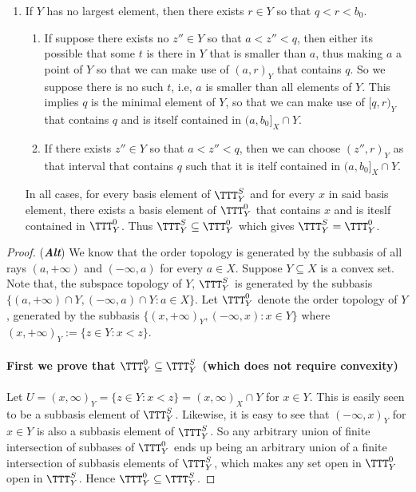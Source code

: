 \documentclass[main.tex]{subfiles}
\begin{document}
{\begin{enumerate}
    \item If $Y$ has no largest element, then there exists $r\in Y$ so that $q<r<b_0$. \begin{enumerate}
        \item If suppose there exists no $z'' \in Y$ so that $a<z''<q$, then either its possible that some $t$ is there in $Y$ that is smaller than $a$, thus making $a$ a point of $Y$ so that we can make use of $(a,r)_Y$ that contains $q$. So we suppose there is no such $t$, i.e, $a$ is smaller than all elements of $Y$. This implies $q$ is the minimal element of $Y$, so that we can make use of $[q,r)_Y$ that contains $q$ and is itself contained in $(a,b_0]_X \cap Y$.
        \item If there exists $z'' \in Y$ so that $a<z''<q$, then we can choose $(z'',r)_Y$ as that interval that contains $q$ such that it is itelf contained in $(a,b_0]_X \cap Y$.
    \end{enumerate} 
In all cases, for every basis element of $\TTT^S_Y$ and for every $x$ in said basis element, there exists a basis element of $\TTT^0_Y$ that contains $x$ and is iteslf contained in $\TTT^0_Y$. Thus $\TTT^S_Y \subseteq \TTT^0_Y$ which gives $\TTT^S_Y=\TTT^0_Y$.
\end{enumerate}
\begin{proof} (\emph{\textbf{Alt}}) We know that the order topology is generated by the subbasis of all rays $(a,+\infty)$ and $(-\infty,a)$ for every $a \in X$. Suppose $Y \subseteq X$ is a convex set. Note that, the subspace topology of $Y$, $\TTT^S_Y$ is generated by the subbasis $\{(a,+\infty) \cap Y, (-\infty,a) \cap Y: a \in X\}$. Let $\TTT^0_Y$ denote the order topology of $Y$, generated by the subbasis $\{(x,+\infty)_Y, (-\infty,x): x \in Y\}$ where $(x,+\infty)_Y:=\{z \in Y: x<z\}$. 
    \\\\ \textbf{First we prove that $\TTT^0_Y \subseteq \TTT^S_Y$ (which does not require convexity)}
    \\\\ Let $U=(x,\infty)_Y=\{z \in Y: x<z\}=(x,\infty)_X \cap Y$ for $x \in Y$. This is easily seen to be a subbasis element of $\TTT^S_Y$. Likewise, it is easy to see that $(-\infty,x)_Y$ for $x \in Y$ is also a subbasis element of $\TTT^S_Y$. So any arbitrary union of finite intersection of subbases of $\TTT^0_Y$ ends up being an arbitrary union of a finite intersection of subbasis elements of $\TTT^S_Y$, which makes any set open in $\TTT^0_Y$ open in $\TTT^S_Y$. Hence $\TTT^0_Y \subseteq \TTT^S_Y$.

\end{proof}}
\end{document}
